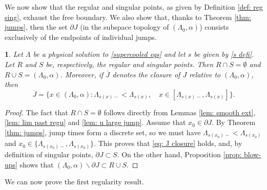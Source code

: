 \documentclass{article}
\numberwithin{equation}{section}
\numberwithin{figure}{section}
\theoremstyle{plain}
\theoremstyle{plain}
\theoremstyle{plain}
\theoremstyle{plain}
\newtheorem{lem}[thm]{\protect\lemmaname}
\theoremstyle{definition}
\theoremstyle{remark}
\providecommand{\lemmaname}{Lemma}
\begin{document}
We now show that the regular and singular points, as given by Definition \ref{def: reg sing}, exhaust the free boundary. We also show that, thanks to Theorem \ref{thm: jumps}, then the set $\partial J$ (in the subspace topology of $(\Lambda_0,\alpha)$) consists exclusively of the endpoints of individual jumps.
\begin{lem} \label{lem: J topology} Let $\Lambda$ be a physical solution to \eqref{supercooled eqs} and let $s$ be given by \eqref{s defi}. Let $R$ and $S$ be, respectively, the regular and singular points. Then $R\cap S= \emptyset$ and $R\cup S=(\Lambda_0,\alpha)$. Moreover, if $\overline{J}$ denotes the closure of $J$ relative to $(\Lambda_0,\alpha)$, then
\begin{equation} \label{eq: J closure}\overline{J}=\{x\in (\Lambda_0,\alpha): \Lambda_{s(x)-}<\Lambda_{s(x)}, \quad x\in [\Lambda_{s(x)-},\Lambda_{s(x)}]\}.\end{equation}
    
\end{lem}
\begin{proof}
The fact that $R\cap S=\emptyset$ follows directly from Lemmas \ref{lem: smooth ext}, \ref{lem: lim past regu} and \ref{lem: u large jump}. Assume that $x_0 \in \partial J$. By Theorem \ref{thm: jumps}, jump times form a discrete set, so we must have $\Lambda_{s(x_0)-}<\Lambda_{s(x_0)}$ and $x_0\in \{\Lambda_{s(x_0)-},\Lambda_{s(x_0)}\}$. This proves that \eqref{eq: J closure} holds, and, by definition of singular points, $\partial J \subset S$. On the other hand, Proposition \ref{prop: blow-ups} shows that $(\Lambda_0,\alpha)\backslash{\partial J} \subset R\cup S$.
\end{proof}
We can now prove the first regularity result.
\end{document}
